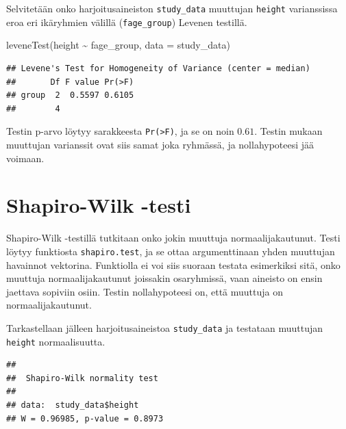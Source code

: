 \documentclass[
]{book}
\newenvironment{Shaded}{\begin{snugshade}}{\end{snugshade}}
\newcommand{\AttributeTok}[1]{\textcolor[rgb]{0.77,0.63,0.00}{#1}}
\newcommand{\FunctionTok}[1]{\textcolor[rgb]{0.00,0.00,0.00}{#1}}
\newcommand{\NormalTok}[1]{#1}
\newcommand{\SpecialCharTok}[1]{\textcolor[rgb]{0.00,0.00,0.00}{#1}}
\begin{document}
Selvitetään onko harjoitusaineiston \texttt{study\_data} muuttujan \texttt{height} varianssissa eroa eri ikäryhmien välillä (\texttt{fage\_group}) Levenen testillä.

\begin{Shaded}
\begin{Highlighting}[]
\FunctionTok{leveneTest}\NormalTok{(height }\SpecialCharTok{\textasciitilde{}}\NormalTok{ fage\_group, }\AttributeTok{data =}\NormalTok{ study\_data)}
\end{Highlighting}
\end{Shaded}

\begin{verbatim}
## Levene's Test for Homogeneity of Variance (center = median)
##       Df F value Pr(>F)
## group  2  0.5597 0.6105
##        4
\end{verbatim}

Testin p-arvo löytyy sarakkeesta \texttt{Pr(\textgreater{}F)}, ja se on noin \(0.61\). Testin mukaan muuttujan varianssit ovat siis samat joka ryhmässä, ja nollahypoteesi jää voimaan.

\hypertarget{shapiro}{%
\section{Shapiro-Wilk -testi}\label{shapiro}}

Shapiro-Wilk -testillä tutkitaan onko jokin muuttuja normaalijakautunut. Testi löytyy funktiosta \texttt{shapiro.test}, ja se ottaa argumenttinaan yhden muuttujan havainnot vektorina. Funktiolla ei voi siis suoraan testata esimerkiksi sitä, onko muuttuja normaalijakautunut joissakin osaryhmissä, vaan aineisto on ensin jaettava sopiviin osiin. Testin nollahypoteesi on, että muuttuja on normaalijakautunut.

Tarkastellaan jälleen harjoitusaineistoa \texttt{study\_data} ja testataan muuttujan \texttt{height} normaalisuutta.

\begin{Shaded}
\end{Shaded}

\begin{verbatim}
## 
##  Shapiro-Wilk normality test
## 
## data:  study_data$height
## W = 0.96985, p-value = 0.8973
\end{verbatim}
\end{document}
